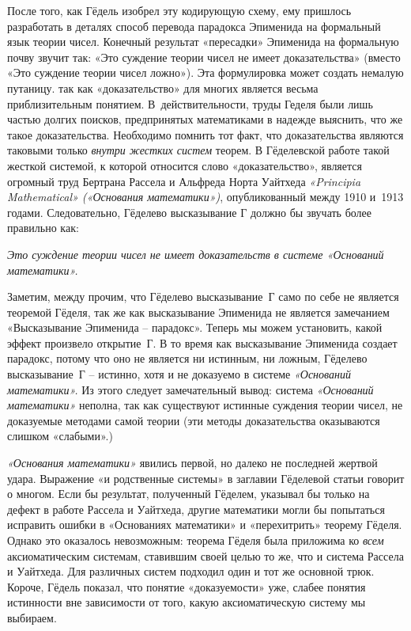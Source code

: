 \documentclass[../main.tex]{subfiles}
\begin{document}
После того, как Гёдель изобрел эту кодирующую схему, ему пришлось разработать в деталях способ перевода парадокса Эпименида на формальный язык теории чисел. Конечный результат «пересадки» Эпименида на формальную почву звучит так: «Это суждение теории чисел не имеет доказательства» (вместо «Это суждение теории чисел ложно»). Эта формулировка может создать немалую путаницу. так как «доказательство» для многих является весьма приблизительным понятием. В~действительности, труды Геделя были лишь частью долгих поисков, предпринятых математиками в надежде выяснить, что же такое доказательства. Необходимо помнить тот факт, что доказательства являются таковыми только \emph{внутри жестких систем} теорем. В Гёделевской работе такой жесткой системой, к которой относится слово «доказательство», является огромный труд Бертрана Рассела и Альфреда Норта Уайтхеда \emph{«Principia Mathematical» («Основания математики»)}, опубликованный между 1910 и~1913 годами. Следовательно, Гёделево высказывание Г должно бы звучать более правильно как:

\emph{Это суждение теории чисел не имеет доказательств в системе «Оснований математики».}

Заметим, между прочим, что Гёделево высказывание~Г само по себе не является теоремой Гёделя, так же как высказывание Эпименида не является замечанием «Высказывание Эпименида \--- парадокс». Теперь мы можем установить, какой эффект произвело открытие~Г\@. В то время как высказывание Эпименида создает парадокс, потому что оно не является ни истинным, ни ложным, Гёделево высказывание~Г \--- истинно, хотя и не доказуемо в системе \emph{«Оснований математики».} Из этого следует замечательный вывод: система \emph{«Оснований математики»} неполна, так как существуют истинные суждения теории чисел, не доказуемые методами самой теории (эти методы доказательства оказываются слишком «слабыми».)

\emph{«Основания математики»} явились первой, но далеко не последней жертвой удара. Выражение «и родственные системы» в заглавии Гёделевой статьи говорит о многом. Если бы результат, полученный Гёделем, указывал бы только на дефект в работе Рассела и Уайтхеда, другие математики могли бы попытаться исправить ошибки в «Основаниях математики» и «перехитрить» теорему Гёделя. Однако это оказалось невозможным: теорема Гёделя была приложима ко \emph{всем} аксиоматическим системам, ставившим своей целью то же, что и система Рассела и Уайтхеда. Для различных систем подходил один и тот же основной трюк. Короче, Гёдель показал, что понятие «доказуемости» уже, слабее понятия истинности вне зависимости от того, какую аксиоматическую систему мы выбираем.
\end{document}
